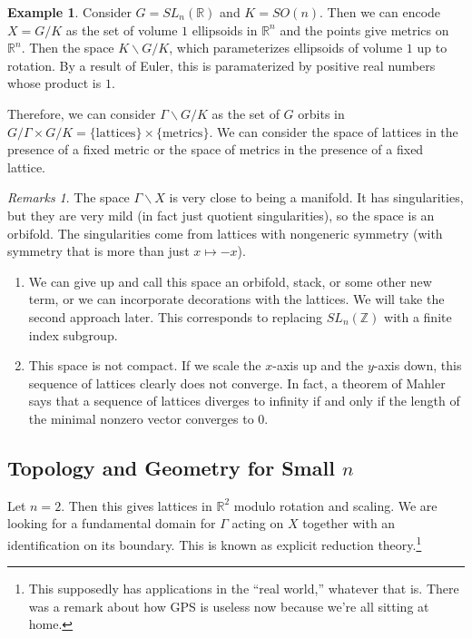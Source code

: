 \documentclass[leqno, openany]{memoir}
\theoremstyle{definition}
\newtheorem{exm}[thm]{Example}
\theoremstyle{remark}
\newtheorem{rmks}[thm]{Remarks}
\theoremstyle{plain}
\theoremstyle{definition}
\theoremstyle{remark}
\newcommand{\R}{\mathbb{R}}
\newcommand{\Z}{\mathbb{Z}}
\begin{document}
\begin{exm} Consider $G = SL_n(\R)$ and $K = SO(n)$. Then we can encode $X =
    G/K$ as the set of volume $1$ ellipsoids in $\R^n$ and the points give
    metrics on $\R^n$. Then the space $K \backslash G / K$, which parameterizes
    ellipsoids of volume $1$ up to rotation. By a result of Euler, this is
    paramaterized by positive real numbers whose product is $1$.  \end{exm}

Therefore, we can consider $\Gamma \backslash G / K$ as the set of $G$ orbits
in $G/\Gamma \times G/K = \{ \text{lattices} \} \times \{ \text{metrics} \}$.
We can consider the space of lattices in the presence of a fixed metric or the
space of metrics in the presence of a fixed lattice.

\begin{rmks} The space $\Gamma \backslash X$ is very close to being a manifold.
    It has singularities, but they are very mild (in fact just quotient
    singularities), so the space is an orbifold. The singularities come from
    lattices with nongeneric symmetry (with symmetry that is more than just $x
    \mapsto -x$).

    \begin{enumerate} \item We can give up and call this space an orbifold,
        stack, or some other new term, or we can incorporate decorations with
        the lattices. We will take the second approach later. This corresponds
        to replacing $SL_n(\Z)$ with a finite index subgroup.  \item This space
        is not compact. If we scale the $x$-axis up and the $y$-axis down, this
        sequence of lattices clearly does not converge. In fact, a theorem of
        Mahler says that a sequence of lattices diverges to infinity if and
        only if the length of the minimal nonzero vector converges to $0$.
\end{enumerate} \end{rmks}

\subsection{Topology and Geometry for Small $n$}%
\label{sub:topology_and_geometry_for_small_n_}

Let $n = 2$. Then this gives lattices in $\R^2$ modulo rotation and scaling. We
are looking for a fundamental domain for $\Gamma$ acting on $X$ together with
an identification on its boundary. This is known as explicit reduction
theory.\footnote{This supposedly has applications in the ``real world,''
whatever that is. There was a remark about how GPS is useless now because we're
all sitting at home.}
\end{document}
